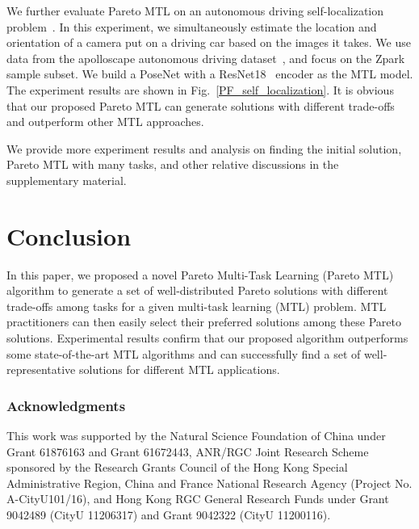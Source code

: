 We further evaluate Pareto MTL on an autonomous driving self-localization problem~\cite{wang2018dels}. In this experiment, we simultaneously estimate the location and orientation of a camera put on a driving car based on the images it takes. We use data from the apolloscape autonomous driving dataset~\cite{apolloscape_arXiv_2018,wang2019the}, and focus on the Zpark sample subset. We build a PoseNet with a ResNet18~\cite{kendall2015posenet} encoder as the MTL model. The experiment results are shown in Fig.~\ref{PF_self_localization}. It is obvious that our proposed Pareto MTL can generate solutions with different trade-offs and outperform other MTL approaches.

We provide more experiment results and analysis on finding the initial solution, Pareto MTL with many tasks, and other relative discussions in the supplementary material.

\section{Conclusion}
In this paper, we proposed a novel Pareto Multi-Task Learning (Pareto MTL) algorithm to generate a set of well-distributed Pareto solutions with different trade-offs among tasks for a given multi-task learning (MTL) problem. MTL practitioners can then easily select their preferred solutions among these Pareto solutions. Experimental results confirm that our proposed algorithm outperforms some state-of-the-art MTL algorithms and can successfully find a set of well-representative solutions for different MTL applications.

\clearpage

\subsubsection*{Acknowledgments}
This work was supported by the Natural Science Foundation of China under Grant 61876163 and Grant 61672443, ANR/RGC Joint Research Scheme sponsored by the Research Grants Council of the Hong Kong Special Administrative Region, China and France National Research Agency (Project No. A-CityU101/16), and Hong Kong RGC General Research Funds under Grant 9042489 (CityU 11206317) and Grant 9042322 (CityU 11200116).

\medskip

\clearpage

